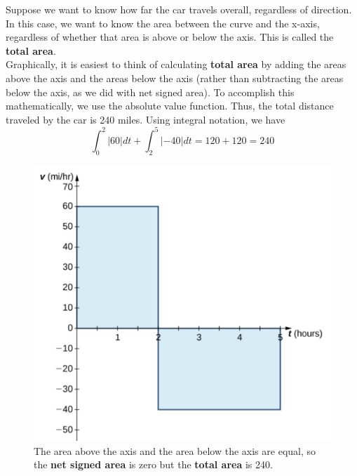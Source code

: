 \noindent Suppose we want to know how far the car travels overall, regardless of direction. In this case, we want to know the area
between the curve and the x-axis, regardless of whether that area is above or below the axis. This is called the \textbf{total area}.\\

\noindent Graphically, it is easiest to think of calculating \textbf{total area} by adding the areas above the axis and the areas below the axis
(rather than subtracting the areas below the axis, as we did with net signed area). To accomplish this mathematically, we use
the absolute value function. Thus, the total distance traveled by the car is 240 miles. Using integral notation, we have
\begin{equation}\label{eq:netAreaCar2}
    \int_0^2 |60| dt+\int_2^5 |-40| dt=120+120=240
\end{equation}

\begin{figure}[h!]
    \centering
    \includegraphics[scale=0.4 ]{images/defIntgArea/carVelocity.png}
    \caption{The area above the axis and the area below the axis are equal, so the \textbf{net signed area} is zero but the \textbf{total area} is 240.}
    \label{fig:netAreaCar}
\end{figure}

